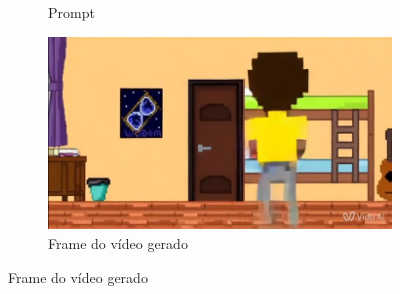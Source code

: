 \begin{figure}[htbp]
\begin{subfigure}{0.35\linewidth}
        \caption{\small Prompt}
        \label{fig:vidu11a}
    \end{subfigure}
    \begin{subfigure}{0.55\linewidth}
        \includegraphics[width=1\linewidth]{figs/vidu/frame11.PNG}
        \caption{\small Frame do vídeo gerado}
        \label{fig:vidu11b}
    \end{subfigure}
\end{figure}

